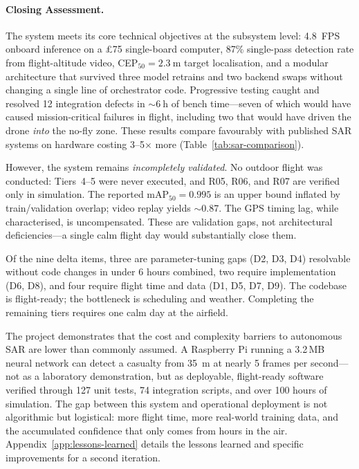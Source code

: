 \paragraph{Closing Assessment.}
The system meets its core technical objectives at the subsystem level: \SI{4.8}{FPS} onboard inference on a \pounds75 single-board computer, 87\% single-pass detection rate from flight-altitude video, CEP$_{50}{=}\SI{2.3}{\metre}$ target localisation, and a modular architecture that survived three model retrains and two backend swaps without changing a single line of orchestrator code. Progressive testing caught and resolved 12 integration defects in ${\sim}\SI{6}{\hour}$ of bench time---seven of which would have caused mission-critical failures in flight, including two that would have driven the drone \emph{into} the no-fly zone. These results compare favourably with published SAR systems on hardware costing 3--5$\times$ more (Table~\ref{tab:sar-comparison}).

However, the system remains \emph{incompletely validated}. No outdoor flight was conducted: Tiers~4--5 were never executed, and R05, R06, and R07 are verified only in simulation. The reported mAP$_{50}{=}0.995$ is an upper bound inflated by train/validation overlap; video replay yields ${\sim}$0.87. The GPS timing lag, while characterised, is uncompensated. These are validation gaps, not architectural deficiencies---a single calm flight day would substantially close them.

Of the nine delta items, three are parameter-tuning gaps (D2, D3, D4) resolvable without code changes in under 6 hours combined, two require implementation (D6, D8), and four require flight time and data (D1, D5, D7, D9). The codebase is flight-ready; the bottleneck is scheduling and weather. Completing the remaining tiers requires one calm day at the airfield.

The project demonstrates that the cost and complexity barriers to autonomous SAR are lower than commonly assumed. A Raspberry Pi running a 3.2\,MB neural network can detect a casualty from \SI{35}{\metre} at nearly 5 frames per second---not as a laboratory demonstration, but as deployable, flight-ready software verified through 127 unit tests, 74 integration scripts, and over 100 hours of simulation. The gap between this system and operational deployment is not algorithmic but logistical: more flight time, more real-world training data, and the accumulated confidence that only comes from hours in the air. Appendix~\ref{app:lessons-learned} details the lessons learned and specific improvements for a second iteration.


